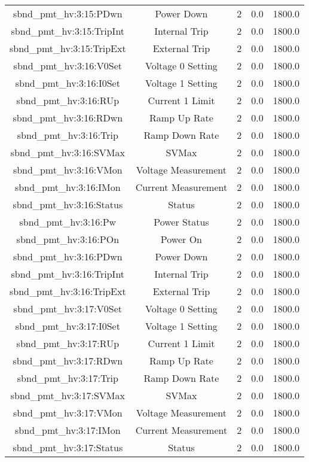 \begin{center}
\begin{longtable}{c | c c c c }
sbnd\_pmt\_hv:3:15:PDwn & Power Down & 2 & 0.0 & 1800.0\\ 
sbnd\_pmt\_hv:3:15:TripInt & Internal Trip & 2 & 0.0 & 1800.0\\ 
sbnd\_pmt\_hv:3:15:TripExt & External Trip & 2 & 0.0 & 1800.0\\ 
sbnd\_pmt\_hv:3:16:V0Set & Voltage 0 Setting & 2 & 0.0 & 1800.0\\ 
sbnd\_pmt\_hv:3:16:I0Set & Voltage 1 Setting & 2 & 0.0 & 1800.0\\ 
sbnd\_pmt\_hv:3:16:RUp & Current 1 Limit & 2 & 0.0 & 1800.0\\ 
sbnd\_pmt\_hv:3:16:RDwn & Ramp Up Rate & 2 & 0.0 & 1800.0\\ 
sbnd\_pmt\_hv:3:16:Trip & Ramp Down Rate & 2 & 0.0 & 1800.0\\ 
sbnd\_pmt\_hv:3:16:SVMax & SVMax & 2 & 0.0 & 1800.0\\ 
sbnd\_pmt\_hv:3:16:VMon & Voltage Measurement & 2 & 0.0 & 1800.0\\ 
sbnd\_pmt\_hv:3:16:IMon & Current Measurement & 2 & 0.0 & 1800.0\\ 
sbnd\_pmt\_hv:3:16:Status & Status & 2 & 0.0 & 1800.0\\ 
sbnd\_pmt\_hv:3:16:Pw & Power Status & 2 & 0.0 & 1800.0\\ 
sbnd\_pmt\_hv:3:16:POn & Power On & 2 & 0.0 & 1800.0\\ 
sbnd\_pmt\_hv:3:16:PDwn & Power Down & 2 & 0.0 & 1800.0\\ 
sbnd\_pmt\_hv:3:16:TripInt & Internal Trip & 2 & 0.0 & 1800.0\\ 
sbnd\_pmt\_hv:3:16:TripExt & External Trip & 2 & 0.0 & 1800.0\\ 
sbnd\_pmt\_hv:3:17:V0Set & Voltage 0 Setting & 2 & 0.0 & 1800.0\\ 
sbnd\_pmt\_hv:3:17:I0Set & Voltage 1 Setting & 2 & 0.0 & 1800.0\\ 
sbnd\_pmt\_hv:3:17:RUp & Current 1 Limit & 2 & 0.0 & 1800.0\\ 
sbnd\_pmt\_hv:3:17:RDwn & Ramp Up Rate & 2 & 0.0 & 1800.0\\ 
sbnd\_pmt\_hv:3:17:Trip & Ramp Down Rate & 2 & 0.0 & 1800.0\\ 
sbnd\_pmt\_hv:3:17:SVMax & SVMax & 2 & 0.0 & 1800.0\\ 
sbnd\_pmt\_hv:3:17:VMon & Voltage Measurement & 2 & 0.0 & 1800.0\\ 
sbnd\_pmt\_hv:3:17:IMon & Current Measurement & 2 & 0.0 & 1800.0\\ 
sbnd\_pmt\_hv:3:17:Status & Status & 2 & 0.0 & 1800.0\\ 

\end{longtable}
\end{center}
